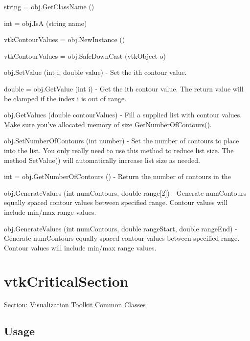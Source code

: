 \begin{DoxyItemize}
\item {\ttfamily string = obj.\-Get\-Class\-Name ()}  
\item {\ttfamily int = obj.\-Is\-A (string name)}  
\item {\ttfamily vtk\-Contour\-Values = obj.\-New\-Instance ()}  
\item {\ttfamily vtk\-Contour\-Values = obj.\-Safe\-Down\-Cast (vtk\-Object o)}  
\item {\ttfamily obj.\-Set\-Value (int i, double value)} -\/ Set the ith contour value.  
\item {\ttfamily double = obj.\-Get\-Value (int i)} -\/ Get the ith contour value. The return value will be clamped if the index i is out of range.  
\item {\ttfamily obj.\-Get\-Values (double contour\-Values)} -\/ Fill a supplied list with contour values. Make sure you've allocated memory of size Get\-Number\-Of\-Contours().  
\item {\ttfamily obj.\-Set\-Number\-Of\-Contours (int number)} -\/ Set the number of contours to place into the list. You only really need to use this method to reduce list size. The method Set\-Value() will automatically increase list size as needed.  
\item {\ttfamily int = obj.\-Get\-Number\-Of\-Contours ()} -\/ Return the number of contours in the  
\item {\ttfamily obj.\-Generate\-Values (int num\-Contours, double range\mbox{[}2\mbox{]})} -\/ Generate num\-Contours equally spaced contour values between specified range. Contour values will include min/max range values.  
\item {\ttfamily obj.\-Generate\-Values (int num\-Contours, double range\-Start, double range\-End)} -\/ Generate num\-Contours equally spaced contour values between specified range. Contour values will include min/max range values.  
\end{DoxyItemize}\hypertarget{vtkcommon_vtkcriticalsection}{}\section{vtk\-Critical\-Section}\label{vtkcommon_vtkcriticalsection}
Section\-: \hyperlink{sec_vtkcommon}{Visualization Toolkit Common Classes} \hypertarget{vtkwidgets_vtkxyplotwidget_Usage}{}\subsection{Usage}\label{vtkwidgets_vtkxyplotwidget_Usage}
